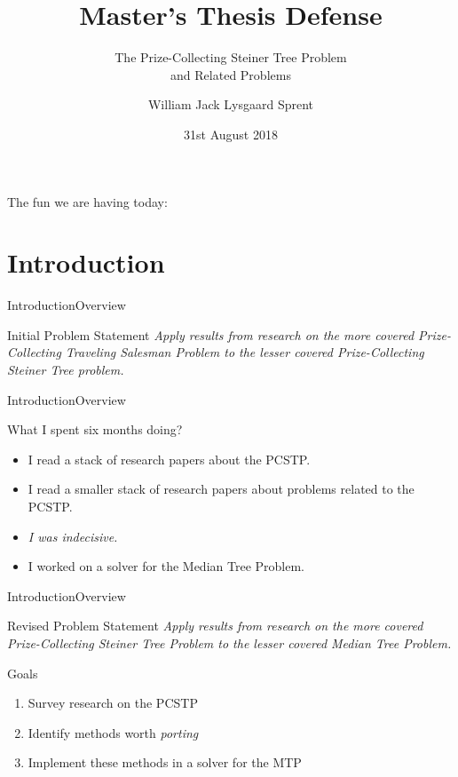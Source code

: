 \documentclass[rgb,dvipsnames]{beamer}
\title{Master's Thesis Defense}
\subtitle{The Prize-Collecting Steiner Tree Problem
  \\and Related Problems}
\author{William Jack Lysgaard Sprent}
\date{31st August 2018}
\institute{DIKU \\ University of Copenhagen}
\begin{document}
 
\frame{\titlepage}

\begin{frame}{The fun we are having today:}
\tableofcontents
\end{frame}

\section{Introduction}

\begin{frame}{Introduction}{Overview}
  \begin{block}{Initial Problem Statement}
    \textit{Apply results from research on the more covered Prize-Collecting Traveling Salesman
    Problem to the lesser covered Prize-Collecting Steiner Tree problem.}
  \end{block}
\end{frame}

\begin{frame}{Introduction}{Overview}
  \begin{block}{What I spent six months doing?}
  \pause
  \begin{itemize}
  \item I read a stack of research papers about the PCSTP.
  \item I read a smaller stack of research papers about problems related to the PCSTP. \pause
  \item \textit{I was indecisive.} \pause
  \item I worked on a solver for the Median Tree Problem.
  \end{itemize}
\end{block}
\end{frame}

\begin{frame}{Introduction}{Overview}
  \begin{block}{Revised Problem Statement}
    \textit{Apply results from research on the more covered Prize-Collecting Steiner Tree
      Problem to the lesser covered Median Tree Problem.}
   \end{block}
   \begin{block}{Goals}
     \begin{enumerate}
     \item Survey research on the PCSTP
     \item Identify methods worth \textit{porting}
     \item Implement these methods in a solver for the MTP
     \end{enumerate}
   \end{block}
\end{frame}
\end{document}
